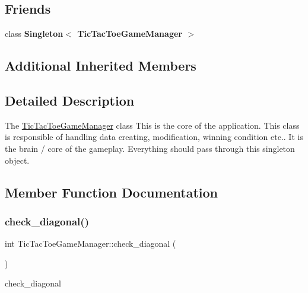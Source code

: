 \subsection*{Friends}
\begin{DoxyCompactItemize}
\item 
\mbox{\label{class_tic_tac_toe_game_manager_ad810229015d6649556c3e37f689094f0}} 
class {\bfseries Singleton$<$ Tic\+Tac\+Toe\+Game\+Manager $>$}
\end{DoxyCompactItemize}
\subsection*{Additional Inherited Members}


\subsection{Detailed Description}
The \hyperlink{class_tic_tac_toe_game_manager}{Tic\+Tac\+Toe\+Game\+Manager} class This is the core of the application. This class is responsible of handling data creating, modification, winning condition etc.. It is the brain / core of the gameplay. Everything should pass through this singleton object. 

\subsection{Member Function Documentation}
\mbox{\label{class_tic_tac_toe_game_manager_a7baa9e6ba971b930f8ace61cc42f034f}} 
\subsubsection{\texorpdfstring{check\+\_\+diagonal()}{check\_diagonal()}}
{\footnotesize\ttfamily int Tic\+Tac\+Toe\+Game\+Manager\+::check\+\_\+diagonal (\begin{DoxyParamCaption}{ }\end{DoxyParamCaption})\hspace{0.3cm}{\ttfamily [protected]}}



check\+\_\+diagonal 

